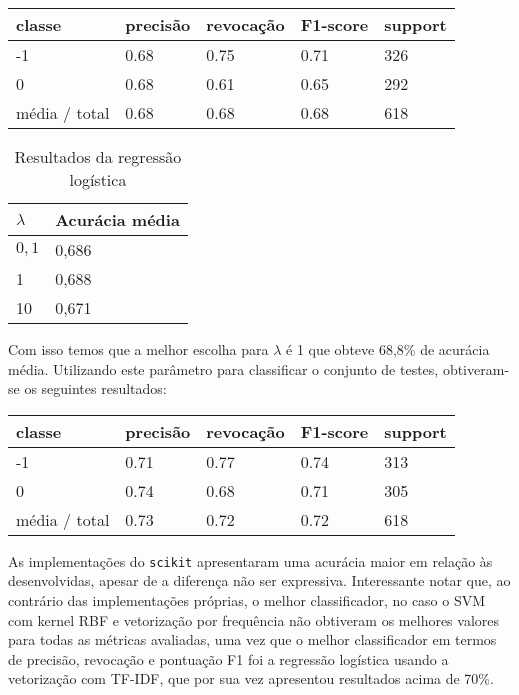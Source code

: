 \begin{table}[H]
	\centering
		\begin{tabular}{l | l | l | l | l}
		\hline
		classe  	&	precisão  &  revocação &  F1-score &  support \\
		\hline
		 -1    &   0.68   &   0.75   &   0.71   &    326 \\
		 \hline
          0    &   0.68   &   0.61   &   0.65   &    292 \\
		\hline
		média / total   &    0.68   &   0.68   &   0.68   &    618 \\
		\hline
	\end{tabular}
\end{table}

\begin{table}[H]
	\centering
	\caption{Resultados da regressão logística}
	\begin{tabular}{l l}
		\hline
		$\lambda$ & Acurácia média \\
		\hline
		$0,1$ & 0,686 \\
		\hline
		1 & 0,688 \\
		\hline
		10 & 0,671 \\
	\end{tabular}
\end{table}


Com isso temos que a melhor escolha para $\lambda$ é 1 que obteve 68,8\% de acurácia média.
Utilizando este parâmetro para classificar o conjunto de testes, obtiveram-se os seguintes resultados:

\begin{table}[H]
	\centering
		\begin{tabular}{l | l | l | l | l}
		\hline
		classe  	&	precisão  &  revocação &  F1-score &  support \\
		\hline
		 -1    &   0.71   &   0.77   &   0.74   &    313 \\
		 \hline
          0    &   0.74   &   0.68   &   0.71   &    305 \\
		\hline
		média / total   &    0.73   &   0.72   &   0.72   &    618 \\
		\hline
	\end{tabular}
\end{table}

As implementações do \texttt{scikit} apresentaram uma acurácia maior em relação às
desenvolvidas, apesar de a diferença não ser expressiva. Interessante notar que,
ao contrário das implementações próprias, o melhor classificador, no caso o SVM
com kernel RBF e vetorização por frequência não obtiveram os melhores valores para
todas as métricas avaliadas, uma vez que o melhor classificador em termos de
precisão, revocação e pontuação F1 foi a regressão logística usando a vetorização
com TF-IDF, que por sua vez apresentou resultados acima de 70\%.

